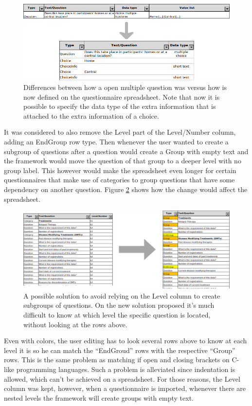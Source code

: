 \begin{figure}
    \center
    \includegraphics[width=.75\textwidth]{choice-neu}
    \caption{Differences between how a open multiple question was versus how is now defined on the questionnaire spreadsheet.
    Note that now it is possible to specify the data type of the extra information that is attached to the extra information of a choice.}
    \label{fig:choice-neu}
\end{figure}

It was considered to also remove the Level part of the Level/Number column, adding an EndGroup row type.
Then whenever the user wanted to create a subgroup of questions after a question would create a Group with empty text and the framework would move the question of that group to a deeper level with no group label.
This however would make the spreadsheet even longer for certain questionnaires that make use of categories to group questions that have some dependency on another question.
Figure \ref{fig:excel-end-group} shows how the change would affect the spreadsheet.

\begin{figure}[h]
    \center
    \includegraphics[width=\textwidth]{excel-end-group}
    \caption{A possible solution to avoid relying on the Level column to create subgroups of questions. On the new solution proposed it's much difficult to know at which level the specific question is located, without looking at the rows above.}
    \label{fig:excel-end-group}
\end{figure}

Even with colors, the user editing has to look several rows above to know at each level it is so he can match the ``EndGroud'' rows with the respective ``Group'' rows.
This is the same problem as matching if open and closing brackets on C-like programming languages.
Such a problem is alleviated since indentation is allowed, which can't be achieved on a spreadsheet.
For those reasons, the Level column was kept, however, when a questionnaire is imported, whenever there are nested levels the framework will create groups with empty text.

